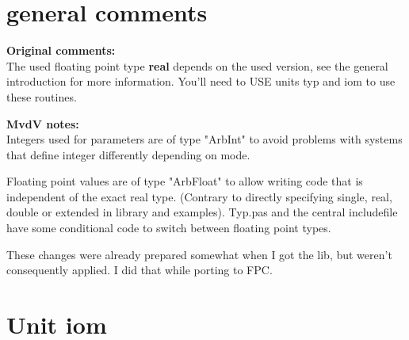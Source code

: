 \documentclass{report}
\begin{document}
\section{general comments}

\textbf{Original comments:} \\
The used floating point type \textbf{real} depends on the used
version, see the general introduction for more information. You'll
need to USE units typ and iom to use these routines.

\textbf{MvdV notes:} \\
Integers used for parameters are of type "ArbInt" to avoid problems
with systems that define integer differently depending on mode.

Floating point values are of type "ArbFloat" to allow writing code
that is independent of the exact real type. (Contrary to directly
specifying single, real, double or extended in library and
examples). Typ.pas and the central includefile have some conditional
code to switch between floating point types.

These changes were already prepared somewhat when I got the lib, but
weren't consequently applied. I did that while porting to FPC.

\section{Unit iom}
\end{document}

